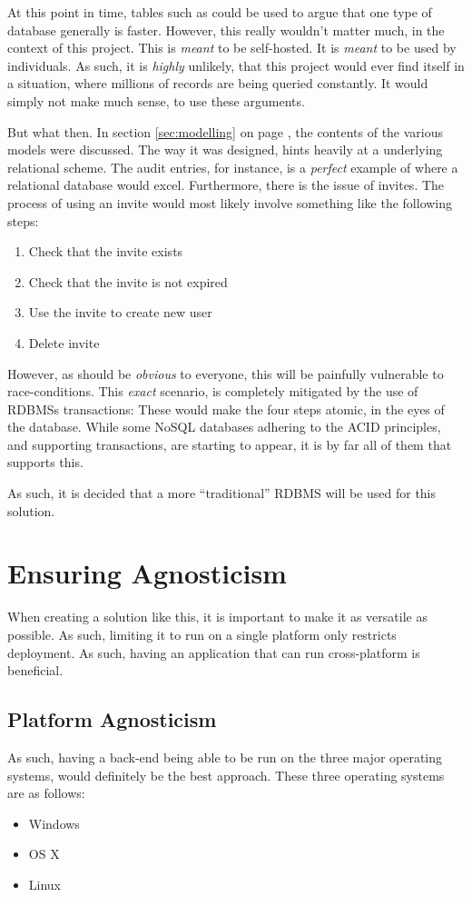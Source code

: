 		At this point in time, tables such as \cite{db_rankings} could be used to argue that one type of database generally is faster. However, this really wouldn't matter much, in the context of this project. This is \emph{meant} to be self-hosted. It is \emph{meant} to be used by individuals. As such, it is \emph{highly} unlikely, that this project would ever find itself in a situation, where millions of records are being queried constantly. It would simply not make much sense, to use these arguments.

		But what then. In section \ref{sec:modelling} on page \pageref{sec:modelling}, the contents of the various models were discussed. The way it was designed, hints heavily at a underlying relational scheme. The audit entries, for instance, is a \emph{perfect} example of where a relational database would excel. Furthermore, there is the issue of invites. The process of using an invite would most likely involve something like the following steps:
		\begin{enumerate}
			\item Check that the invite exists
			\item Check that the invite is not expired
			\item Use the invite to create new user
			\item Delete invite
		\end{enumerate}
		However, as should be \emph{obvious} to everyone, this will be painfully vulnerable to race-conditions. This \emph{exact} scenario, is completely mitigated by the use of RDBMSs transactions: These would make the four steps atomic, in the eyes of the database. While some NoSQL databases adhering to the ACID principles, and supporting transactions, are starting to appear\cite{no_sql_transactions}, it is by far all of them that supports this.

		As such, it is decided that a more ``traditional'' RDBMS will be used for this solution.

	\section{Ensuring Agnosticism}
		When creating a solution like this, it is important to make it as versatile as possible. As such, limiting it to run on a single platform only restricts deployment. As such, having an application that can run cross-platform is beneficial.

		\subsection{Platform Agnosticism}
			\label{sec:restrict:platform}
			As such, having a back-end being able to be run on the three major operating systems, would definitely be the best approach. These three operating systems are as follows:
			\begin{itemize}
				\item Windows
				\item OS X
				\item Linux
			\end{itemize}

